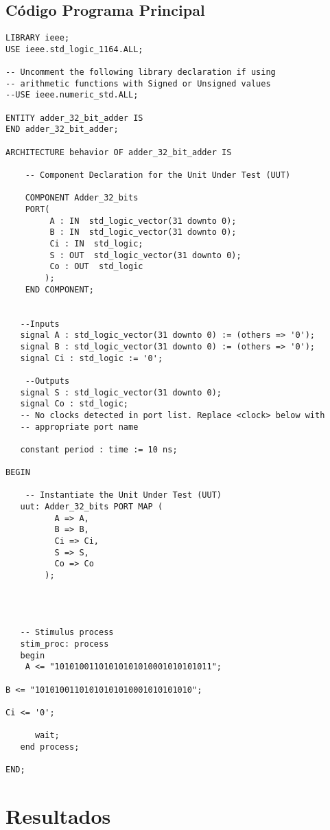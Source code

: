 \documentclass[12pt]{article}
\begin{document}
\subsection{Código Programa Principal}

\begin{lstlisting}
LIBRARY ieee;
USE ieee.std_logic_1164.ALL;
 
-- Uncomment the following library declaration if using
-- arithmetic functions with Signed or Unsigned values
--USE ieee.numeric_std.ALL;
 
ENTITY adder_32_bit_adder IS
END adder_32_bit_adder;
 
ARCHITECTURE behavior OF adder_32_bit_adder IS 
 
    -- Component Declaration for the Unit Under Test (UUT)
 
    COMPONENT Adder_32_bits
    PORT(
         A : IN  std_logic_vector(31 downto 0);
         B : IN  std_logic_vector(31 downto 0);
         Ci : IN  std_logic;
         S : OUT  std_logic_vector(31 downto 0);
         Co : OUT  std_logic
        );
    END COMPONENT;
    

   --Inputs
   signal A : std_logic_vector(31 downto 0) := (others => '0');
   signal B : std_logic_vector(31 downto 0) := (others => '0');
   signal Ci : std_logic := '0';

 	--Outputs
   signal S : std_logic_vector(31 downto 0);
   signal Co : std_logic;
   -- No clocks detected in port list. Replace <clock> below with 
   -- appropriate port name 
 
   constant period : time := 10 ns;
 
BEGIN
 
	-- Instantiate the Unit Under Test (UUT)
   uut: Adder_32_bits PORT MAP (
          A => A,
          B => B,
          Ci => Ci,
          S => S,
          Co => Co
        );


 

   -- Stimulus process
   stim_proc: process
   begin		
    A <= "10101001101010101010001010101011";

B <= "10101001101010101010001010101010";

Ci <= '0';

      wait;
   end process;

END;
\end{lstlisting}

\section{Resultados}
\end{document}
